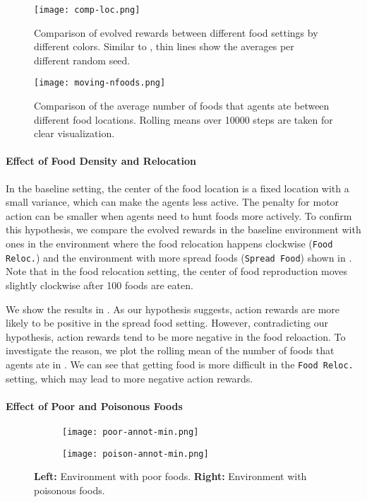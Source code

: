 \begin{figure}[ht]
  \centering
  \texttt{[image: comp-loc.png]}
  \caption{
    Comparison of evolved rewards between different food settings by different colors.
    Similar to , thin lines show the averages per different random seed.
  }\label{figure:result-foodloc}
\end{figure}

\begin{figure}[!htb]
  \centering
  \texttt{[image: moving-nfoods.png]}
  \caption{
    Comparison of the average number of foods that agents ate between different food locations.
    Rolling means over 10000 steps are taken for clear visualization.
  }\label{figure:result-nfood}
\end{figure}

\paragraph{Effect of Food Density and Relocation}
In the baseline setting, the center of the food location is a fixed location with a small variance, which can make the agents less active. The penalty for motor action can be smaller when agents need to hunt foods more actively. To confirm this hypothesis, we compare the evolved rewards in the baseline environment with ones in the environment where the food relocation happens clockwise (\texttt{Food Reloc.}) and the environment with more spread foods (\texttt{Spread Food}) shown in . Note that in the food relocation setting, the center of food reproduction moves slightly clockwise after 100 foods are eaten.

We show the results in . As our hypothesis suggests, action rewards are more likely to be positive in the spread food setting. However, contradicting our hypothesis, action rewards tend to be more negative in the food reloaction. To investigate the reason, we plot the rolling mean of the number of foods that agents ate in . We can see that getting food is more difficult in the \texttt{Food Reloc.} setting, which may lead to more negative action rewards.

\paragraph{Effect of Poor and Poisonous Foods}

\begin{figure}[t]
  \begin{subfigure}[t]{4cm}
    \centering
    \texttt{[image: poor-annot-min.png]}
  \end{subfigure}
  \begin{subfigure}[t]{4cm}
    \centering
    \texttt{[image: poison-annot-min.png]}
  \end{subfigure}
  \caption{
    \textbf{Left:} Environment with poor foods.
    \textbf{Right:} Environment with poisonous foods.
  }\label{figure:pp}
\end{figure}

